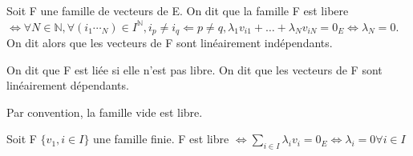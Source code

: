 \documentclass[french]{yLectureNote}
\newcommand{\N}[0]{\mathbb{N}}
\begin{document}

\begin{definition}
Soit F une famille de vecteurs de E. On dit que la famille F est libere \(\iff \forall N\in\N, \forall(i_1\dotsi_N)\in I^{\N}, i_p\neq i_q \Leftarrow p\neq q, \lambda_1v_{i1}+\dots + \lambda_N v_{iN} =0_E \iff \lambda_N = 0\). On dit alors que les vecteurs de F sont linéairement indépendants.

On dit que F est liée si elle n'est pas libre. On dit que les vecteurs de F sont linéairement dépendants.

Par convention, la famille vide est libre.
\end{definition}
\begin{proposition}
Soit F \(\{v_1, i\in I\}\) une famille finie. F est libre \(\iff \sum_{i\in I}\lambda_i v_i = 0_E \iff \lambda_i = 0 \forall i\in I\)
\end{proposition}
\end{document}

